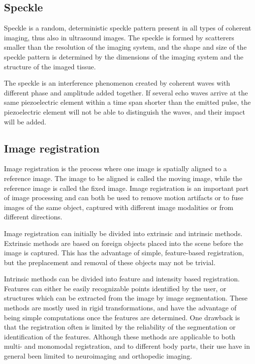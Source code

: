 \subsection{Speckle}
Speckle is a random, deterministic speckle pattern present in all types of coherent imaging, thus also in ultrasound images. The speckle is formed by scatterers smaller than the resolution of the imaging system, and the shape and size of the speckle pattern is determined by the dimensions of the imaging system and the structure of the imaged tissue.

The speckle is an interference phenomenon created by coherent waves with different phase and amplitude added together. If several echo waves arrive at the same piezoelectric element within a time span shorter than the emitted pulse, the piezoelectric element will not be able to distinguish the waves, and their impact will be added. 

\subsection{Image registration}
Image registration is the process where one image is spatially aligned to a reference image. The image to be aligned is called the moving image, while the reference image is called the fixed image. Image registration  is an important part of image processing and can both be used to remove motion artifacts or to fuse images of the same object, captured with different image modalities or from different directions. 

Image registration can initially be divided into extrinsic and intrinsic methods. Extrinsic methods are based on foreign objects placed into the scene before the image is captured. This has the advantage of simple, feature-based registration, but the preplacement and removal of these objects may not be trivial. 

Intrinsic methods can be divided into feature and intensity based registration. Features can either be easily recognizable points identified by the user, or structures which can be extracted from the image by image segmentation. These methods are mostly used in rigid transformations, and have the advantage of being simple computations once the features are determined. One drawback is that the registration often is limited by the reliability of the segmentation or identification of the features. Although these methods are applicable to both multi- and monomodal registration, and to different body parts, their use have in general been limited to neuroimaging and orthopedic imaging\cite{Maintz1998}.

